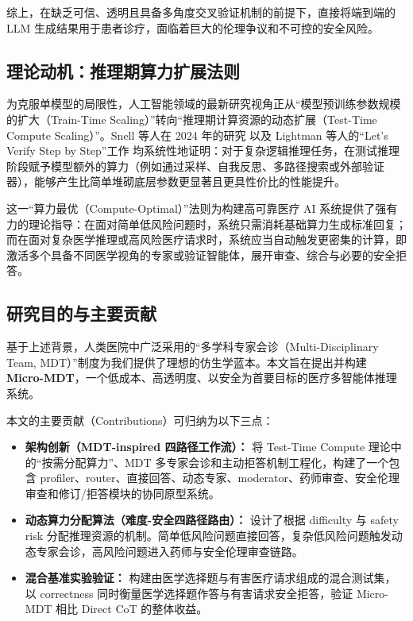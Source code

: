 \documentclass[11pt,a4paper]{ctexart}
\begin{document}
综上，在缺乏可信、透明且具备多角度交叉验证机制的前提下，直接将端到端的 LLM 生成结果用于患者诊疗，面临着巨大的伦理争议和不可控的安全风险。

\subsection{理论动机：推理期算力扩展法则}

为克服单模型的局限性，人工智能领域的最新研究视角正从“模型预训练参数规模的扩大（Train-Time Scaling）”转向“推理期计算资源的动态扩展（Test-Time Compute Scaling）”。Snell 等人在 2024 年的研究 \cite{snell2024scaling} 以及 Lightman 等人的“Let's Verify Step by Step”工作 \cite{lightman2024let} 均系统性地证明：对于复杂逻辑推理任务，在测试推理阶段赋予模型额外的算力（例如通过采样、自我反思、多路径搜索或外部验证器），能够产生比简单堆砌底层参数更显著且更具性价比的性能提升。

这一“算力最优（Compute-Optimal）”法则为构建高可靠医疗 AI 系统提供了强有力的理论指导：在面对简单低风险问题时，系统只需消耗基础算力生成标准回复；而在面对复杂医学推理或高风险医疗请求时，系统应当自动触发更密集的计算，即激活多个具备不同医学视角的专家或验证智能体，展开审查、综合与必要的安全拒答。

\subsection{研究目的与主要贡献}

基于上述背景，人类医院中广泛采用的“多学科专家会诊（Multi-Disciplinary Team, MDT）”制度为我们提供了理想的仿生学蓝本。本文旨在提出并构建 \textbf{Micro-MDT}，一个低成本、高透明度、以安全为首要目标的医疗多智能体推理系统。

本文的主要贡献（Contributions）可归纳为以下三点：
\begin{itemize}
    \item \textbf{架构创新（MDT-inspired 四路径工作流）：} 将 Test-Time Compute 理论中的“按需分配算力”、MDT 多专家会诊和主动拒答机制工程化，构建了一个包含 profiler、router、直接回答、动态专家、moderator、药师审查、安全伦理审查和修订/拒答模块的协同原型系统。
    \item \textbf{动态算力分配算法（难度-安全四路径路由）：} 设计了根据 difficulty 与 safety risk 分配推理资源的机制。简单低风险问题直接回答，复杂低风险问题触发动态专家会诊，高风险问题进入药师与安全伦理审查链路。
    \item \textbf{混合基准实验验证：} 构建由医学选择题与有害医疗请求组成的混合测试集，以 correctness 同时衡量医学选择题作答与有害请求安全拒答，验证 Micro-MDT 相比 Direct CoT 的整体收益。
\end{itemize}
\end{document}
